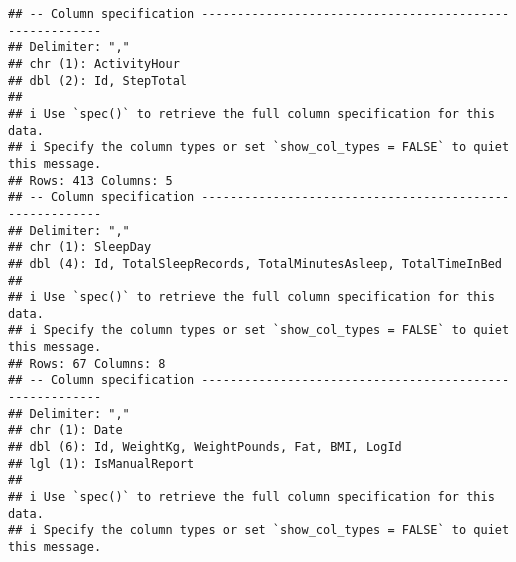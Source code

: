 \documentclass[
]{article}
\begin{document}
\begin{verbatim}
## -- Column specification --------------------------------------------------------
## Delimiter: ","
## chr (1): ActivityHour
## dbl (2): Id, StepTotal
## 
## i Use `spec()` to retrieve the full column specification for this data.
## i Specify the column types or set `show_col_types = FALSE` to quiet this message.
## Rows: 413 Columns: 5
## -- Column specification --------------------------------------------------------
## Delimiter: ","
## chr (1): SleepDay
## dbl (4): Id, TotalSleepRecords, TotalMinutesAsleep, TotalTimeInBed
## 
## i Use `spec()` to retrieve the full column specification for this data.
## i Specify the column types or set `show_col_types = FALSE` to quiet this message.
## Rows: 67 Columns: 8
## -- Column specification --------------------------------------------------------
## Delimiter: ","
## chr (1): Date
## dbl (6): Id, WeightKg, WeightPounds, Fat, BMI, LogId
## lgl (1): IsManualReport
## 
## i Use `spec()` to retrieve the full column specification for this data.
## i Specify the column types or set `show_col_types = FALSE` to quiet this message.
\end{verbatim}
\end{document}
